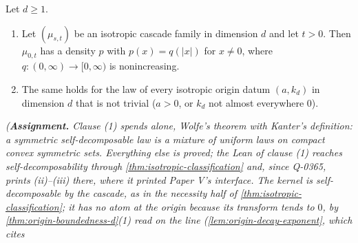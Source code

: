 \begin{proposition}
\label{prop:isotropic-radial-monotone}
\leanok
Let $d \ge 1$.
\begin{enumerate}
\item Let $(\mu_{s,t})$ be an isotropic cascade family in dimension $d$ and let $t > 0$. Then
$\mu_{0,t}$ has a density $p$ with $p(x) = q(|x|)$ for $x \ne 0$, where
$q : (0,\infty) \to [0,\infty)$ is nonincreasing.
\item The same holds for the law of every isotropic origin datum $(a,k_d)$ in dimension $d$ that is
not trivial ($a > 0$, or $k_d$ not almost everywhere $0$).
\end{enumerate}
\statusA\quad{}\quad{}\quad{}\quad\emph{(\textbf{Assignment.} Clause (1)
spends  alone, Wolfe's theorem with Kanter's definition: a symmetric self-decomposable
law is a mixture of uniform laws on compact convex symmetric sets. Everything else is proved; the
Lean of clause (1) reaches self-decomposability through \ref{thm:isotropic-classification} and,
since Q-0365, prints (ii)--(iii) there, where it printed Paper V's interface. The
kernel is self-decomposable by the cascade, as in the necessity half of
\ref{thm:isotropic-classification}; it has no atom at the origin because its transform tends to $0$,
by \ref{thm:origin-boundedness-d}(1) read on the line (\ref{lem:origin-decay-exponent}, which cites
}
\end{proposition}
